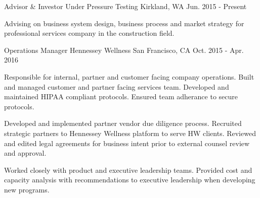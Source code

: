 


\begin{cventries}

\cventry
{Advisor \& Investor} %
{Under Pressure Testing} %
{Kirkland, WA} %
{Jun. 2015 - Present} %
{ %
	\begin{cvitems}
		\item {Advising on business system design, business process and market strategy for professional services company in the construction field.}
	\end{cvitems}
}



\cventry
{Operations Manager} %
{Hennessey Wellness} %
{San Francisco, CA} %
{Oct. 2015 - Apr. 2016} %
{ %
\begin{cvitems}
\item {Responsible for internal, partner and customer facing company operations. Built and managed customer and partner facing services team. Developed and maintained HIPAA compliant protocols. Ensured team adherance to secure protocols.}
\item {Developed and implemented partner vendor due diligence process. Recruited strategic partners to Hennessey Wellness platform to serve HW clients. Reviewed and edited legal agreements for business intent prior to external counsel review and approval.}
\item {Worked closely with product and executive leadership teams. Provided cost and capacity analysis with recommendations to executive leadership when developing new programs.}
\end{cvitems}
}



\end{cventries}
